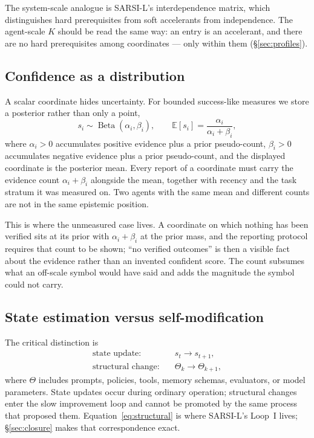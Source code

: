 \documentclass[11pt]{article}
\newcommand{\op}[1]{\operatorname{#1}}
\begin{document}
The system-scale analogue is SARSI-L's interdependence matrix, which distinguishes hard prerequisites from soft accelerants from independence. The agent-scale $K$ should be read the same way: an entry is an accelerant, and there are no hard prerequisites among coordinates --- only within them (\S\ref{sec:profiles}).

\subsection{Confidence as a distribution}
\label{sec:beta}
A scalar coordinate hides uncertainty. For bounded success-like measures we store a posterior rather than only a point,
\begin{equation}
s_i \sim \op{Beta}(\alpha_i, \beta_i),
\qquad
\mathbb{E}[s_i] = \frac{\alpha_i}{\alpha_i + \beta_i},
\label{eq:beta}
\end{equation}
where $\alpha_i>0$ accumulates positive evidence plus a prior pseudo-count, $\beta_i>0$ accumulates negative evidence plus a prior pseudo-count, and the displayed coordinate is the posterior mean. Every report of a coordinate must carry the evidence count $\alpha_i+\beta_i$ alongside the mean, together with recency and the task stratum it was measured on. Two agents with the same mean and different counts are not in the same epistemic position.

This is where the unmeasured case lives. A coordinate on which nothing has been verified sits at its prior with $\alpha_i+\beta_i$ at the prior mass, and the reporting protocol requires that count to be shown; ``no verified outcomes'' is then a visible fact about the evidence rather than an invented confident score. The count subsumes what an off-scale symbol would have said and adds the magnitude the symbol could not carry.

\subsection{State estimation versus self-modification}
The critical distinction is
\begin{align}
\text{state update:} \quad & s_t \rightarrow s_{t+1}, \label{eq:stateupdate}\\
\text{structural change:} \quad & \Theta_k \rightarrow \Theta_{k+1}, \label{eq:structural}
\end{align}
where $\Theta$ includes prompts, policies, tools, memory schemas, evaluators, or model parameters. State updates occur during ordinary operation; structural changes enter the slow improvement loop and cannot be promoted by the same process that proposed them. Equation~\eqref{eq:structural} is where SARSI-L's Loop~I lives; \S\ref{sec:closure} makes that correspondence exact.
\end{document}
